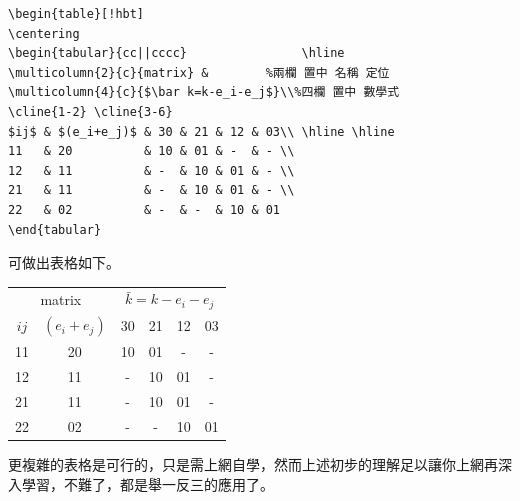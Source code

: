 \begin{Verbatim}[frame=single,firstline=1,label=A bit complicated tabular]
\begin{table}[!hbt]
\centering
\begin{tabular}{cc||cccc}                \hline
\multicolumn{2}{c}{matrix} &        %兩欄 置中 名稱 定位
\multicolumn{4}{c}{$\bar k=k-e_i-e_j$}\\%四欄 置中 數學式
\cline{1-2} \cline{3-6}
$ij$ & $(e_i+e_j)$ & 30 & 21 & 12 & 03\\ \hline \hline
11   & 20          & 10 & 01 & -  & - \\ 
12   & 11          & -  & 10 & 01 & - \\  
21   & 11          & -  & 10 & 01 & - \\  
22   & 02          & -  & -  & 10 & 01    
\end{tabular}
\end{Verbatim}
可做出表格如下。
\begin{table}[!hbt]
\centering
\begin{tabular}{cc||cccc}                \hline
\multicolumn{2}{c}{matrix} & 
\multicolumn{4}{c}{$\bar k=k-e_i-e_j$}\\ 
\cline{1-2} \cline{3-6}
$ij$ & $(e_i+e_j)$ & 30 & 21 & 12 & 03\\ \hline \hline
11   & 20          & 10 & 01 & -  & - \\ 
12   & 11          & -  & 10 & 01 & - \\  
21   & 11          & -  & 10 & 01 & - \\  
22   & 02          & -  & -  & 10 & 01  
\end{tabular}
\end{table}
更複雜的表格是可行的，只是需上網自學，然而上述初步的理解足以讓你上網再深入學習，不難了，都是舉一反三的應用了。



